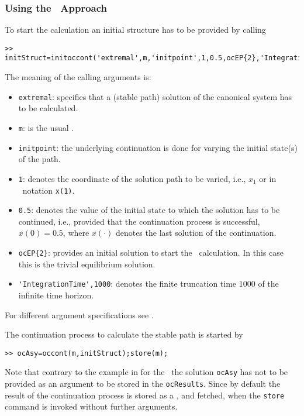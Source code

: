 \subsubsection{Using the \BVP\ Approach}
To start the calculation an initial structure has to be provided by calling
\begin{lstlisting}
>> initStruct=initoccont('extremal',m,'initpoint',1,0.5,ocEP{2},'IntegrationTime',1000);
\end{lstlisting}
The meaning of the calling arguments is:
\begin{itemize}
	\item \lstinline+extremal+: specifies that a (stable path) solution of the canonical system has to be calculated.
	\item \lstinline+m+: is the usual \ocmodel.
	\item \lstinline+initpoint+: the underlying continuation is done for varying the initial state(s) of the path.
	\item \lstinline+1+: denotes the coordinate of the solution path to be varied, i.e., $x_1$ or in \MATL\ notation \lstinline+x(1)+.
	\item \lstinline+0.5+: denotes the value of the initial state to which the solution has to be continued, i.e., provided that the continuation process is successful, $x(0)=0.5$, where $x(\cdot)$ denotes the last solution of the continuation.
	\item \lstinline+ocEP{2}+: provides an initial solution to start the \BVP\ calculation. In this case this is the trivial equilibrium solution.
	\item \lstinline+'IntegrationTime',1000+: denotes the finite truncation time $1000$ of the infinite time horizon.
\end{itemize}
For different argument specifications see .

The continuation process to calculate the stable path is started by
\begin{lstlisting}
>> ocAsy=occont(m,initStruct);store(m);
\end{lstlisting}
\begin{remark}
Note that contrary to the example in for the \IVP\ the solution \lstinline+ocAsy+ has not to be provided as an argument to be stored in the \lstinline+ocResults+. Since by default the result of the continuation process is stored as a \matfile, and fetched, when the \lstinline+store+ command is invoked without further arguments.
\end{remark} 

